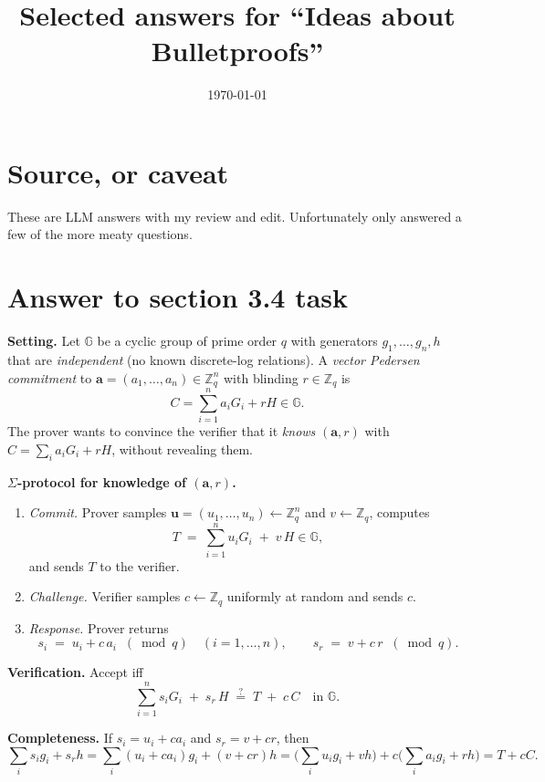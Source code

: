 \documentclass[11pt,a4paper]{article}
\title{Selected answers for ``Ideas about Bulletproofs''}
\date{\today}
\begin{document}
\maketitle
\small

\section{Source, or caveat}

These are LLM answers with my review and edit. Unfortunately only answered a few of the more meaty questions.


\section{Answer to section 3.4 task}

\textbf{Setting.} Let $\mathbb{G}$ be a cyclic group of prime order $q$ with generators
$g_1,\ldots,g_n,h$ that are \emph{independent} (no known discrete-log relations).
A \emph{vector Pedersen commitment} to $\mathbf{a}=(a_1,\ldots,a_n)\in\mathbb{Z}_q^n$
with blinding $r\in\mathbb{Z}_q$ is
\[
C = \sum_{i=1}^n a_i G_i + rH \in \mathbb{G}.
\]
The prover wants to convince the verifier that it \emph{knows} $(\mathbf{a},r)$ with
$C=\sum_i a_i G_i + r H$, without revealing them.

\medskip
\textbf{$\Sigma$-protocol for knowledge of $(\mathbf{a},r)$.}
\begin{enumerate}
  \item \emph{Commit.} Prover samples $\mathbf{u}=(u_1,\ldots,u_n)\leftarrow \mathbb{Z}_q^n$ and
        $v\leftarrow \mathbb{Z}_q$, computes
        \[
        T \;=\; \sum_{i=1}^n u_i G_i \;+\; v\,H \in \mathbb{G},
        \]
        and sends $T$ to the verifier.
  \item \emph{Challenge.} Verifier samples $c\leftarrow \mathbb{Z}_q$ uniformly at random and sends $c$.
  \item \emph{Response.} Prover returns
        \[
        s_i \;=\; u_i + c\,a_i \;\;(\bmod q)\quad (i=1,\ldots,n), 
        \qquad s_r \;=\; v + c\,r \;\;(\bmod q).
        \]
\end{enumerate}

\textbf{Verification.} Accept iff
\[
\sum_{i=1}^n s_i G_i \;+\; s_r\,H \;\stackrel{?}{=}\; T \;+\; c\,C \quad \text{in } \mathbb{G}.
\]

\textbf{Completeness.} If $s_i=u_i+c a_i$ and $s_r=v+c r$, then
\[
\sum_i s_i g_i + s_r h
= \sum_i (u_i + c a_i) g_i + (v + c r)h
= \Big(\sum_i u_i g_i + v h\Big) + c\Big(\sum_i a_i g_i + r h\Big)
= T + c C.
\]
\end{document}
